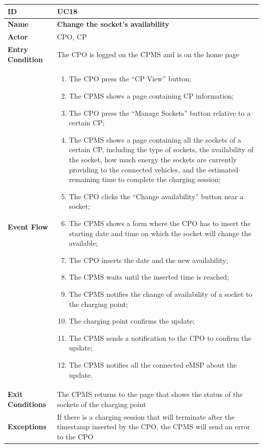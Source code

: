 \documentclass{Configuration_Files/PoliMi3i_thesis}
\begin{document}
\begin{table}[H]
    \begin{xltabular}{\textwidth}{| >{}l | X |}
    \hline
    \textbf{ID} & \textbf{UC18}\T\B\\
    \hline
    \textbf{Name} & \textbf{Change the socket’s  availability}\T\B\\
    \hline \hline
    \textbf{Actor} & CPO, CP\T\B \\
    \hline
    \textbf{Entry Condition} & The CPO is logged on the CPMS and is on the home page\T\B\\
    \hline
    \textbf{Event Flow} & 
        \begin{enumerate}
        \item The CPO press the “CP View” button;
        \item The CPMS shows a page containing CP information;
        \item The CPO press the “Manage Sockets” button relative to a certain CP;
        \item The CPMS shows a page containing all the sockets of a certain CP, including the type of sockets, the availability of the socket, how much energy the sockets are currently providing to the connected vehicles, and the estimated remaining time to complete the charging session;
        \item The CPO clicks the “Change availability” button near a socket;
        \item The CPMS shows a form where the CPO has to insert the starting date and time on which the socket will change the available;
        \item The CPO inserts the date and the new availability;
        \item The CPMS waits until the inserted time is reached;
        \item The CPMS notifies the change of availability of a socket to the charging point;
        \item The charging point confirms the update;
        \item The CPMS sends a notification to the CPO to confirm the update;
        \item The CPMS notifies all the connected eMSP about the update.
        \end{enumerate}\B\\
    \hline
    \textbf{Exit Conditions} & The CPMS returns to the page that shows the status of the sockets of the charging point\B\\
    \hline
    \textbf{Exceptions} & If there is a charging session that will terminate after the timestamp inserted by the CPO, the CPMS will send an error to the CPO\B\\
    \hline
    \end{xltabular}
\end{table}
\end{document}
